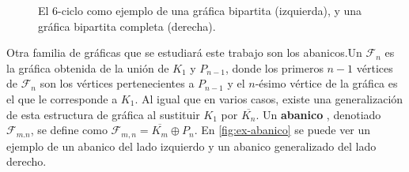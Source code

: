 \begin{figure}[ht!]
    \centering
        \caption{El $6$-ciclo como ejemplo de una gr\'afica bipartita (izquierda), y una gr\'afica bipartita completa (derecha).}
        \label{fig:ex-bip}
    \end{figure}
    
Otra  familia de gr\'aficas que se estudiar\'a este trabajo son los abanicos.Un
 $\mathcal{F}_n$ es la gr\'afica obtenida de la uni\'on de $K_1$
y $P_{n-1}$, donde los primeros $n-1$ v\'ertices de $\mathcal{F}_n$ son los
v\'ertices pertenecientes a $P_{n-1}$ y el $n$-\'esimo v\'ertice de la gr\'afica
es el que le corresponde a $K_1$. 
Al igual que en varios casos, existe una generalizaci\'on de esta
estructura de gr\'afica al sustituir $K_1$ por $\overline{K_n}$. Un
\textbf{abanico} , denotiado
$\mathcal{F}_{m.n}$, se define como $\mathcal{F}_{m,n}=\overline{K_m} \oplus
P_n$. En \cref{fig:ex-abanico} se puede ver un ejemplo de un abanico del lado
izquierdo y un abanico generalizado del lado derecho.

